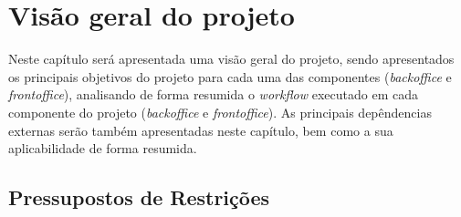 \chapter{Visão geral do projeto}

Neste capítulo será apresentada uma visão geral do projeto, sendo apresentados os principais objetivos do projeto para cada uma das componentes (\textit{backoffice} e \textit{frontoffice}), analisando de forma resumida o \textit{workflow} executado em cada componente do projeto (\textit{backoffice} e \textit{frontoffice}). As principais depêndencias externas serão também apresentadas neste capítulo, bem como a sua aplicabilidade de forma resumida.





\section{Pressupostos de Restrições}

